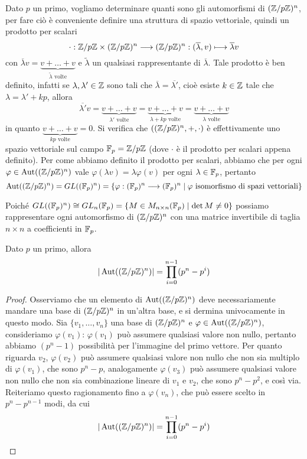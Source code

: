 \documentclass[11pt]{scrartcl}
\begin{document}
Dato $p$ un primo, vogliamo determinare quanti sono gli automorfismi di 
$({\mathbb Z}/p{\mathbb Z})^n$, per fare ciò è conveniente definire una struttura di spazio vettoriale,
quindi un prodotto per scalari\[
    \cdot:{\mathbb Z}/p{\mathbb Z}\times ({\mathbb Z}/p{\mathbb Z})^n \longrightarrow ({\mathbb Z}/p{\mathbb Z})^n : 
    (\overline{\lambda}, v)\longmapsto \overline{\lambda}v
\]
con $\overline{\lambda}v = \underset{\tilde{\lambda}\text{ volte}}{\underbrace{v + \ldots + v}}$
e $\tilde{\lambda}$ un qualsiasi rappresentante di $\overline{\lambda}$.
Tale prodotto è ben definito, infatti se $\lambda, \lambda' \in \mathbb Z$ sono tali che
$\overline{\lambda} = \overline{\lambda'}$, cioè esiste $k \in \mathbb Z$ tale che
$\lambda = \lambda' + kp$, allora \[
    \overline{\lambda'} v = \underset{\lambda'\text{ volte}}{\underbrace{v + \ldots + v}} = 
    \underset{\lambda + kp\text{ volte}}{\underbrace{v + \ldots + v}} = 
    \underset{\lambda\text{ volte}}{\underbrace{v + \ldots + v}}
\]in quanto $\underset{kp\text{ volte}}{\underbrace{v + \ldots + v}} = 0$. 
Si verifica che $(({\mathbb Z}/p{\mathbb Z})^n, +, \cdot)$ è effettivamente uno spazio vettoriale
sul campo $\mathbb F_p = {\mathbb Z}/p{\mathbb Z}$ (dove $\cdot$ è il prodotto per scalari appena definito).
Per come abbiamo definito il prodotto per scalari, abbiamo che per ogni
$\varphi \in \operatorname{Aut}(({\mathbb Z}/p{\mathbb Z})^n)$ vale $\varphi(\lambda v) = \lambda\varphi(v)$ 
per ogni $\lambda \in \mathbb F_p$, pertanto
\[
    \operatorname{Aut}(({\mathbb Z}/p{\mathbb Z})^n) = GL((\mathbb F_p)^n) = \{\varphi: (\mathbb F_p)^n\longrightarrow(\mathbb F_p)^n
    \mid\varphi\text{ isomorfismo di spazi vettoriali}\}
\]

Poiché $GL((\mathbb F_p)^n) \cong GL_n(\mathbb F_p) = \{M \in M_{n\times n}(\mathbb F_p)\mid \det M \neq 0\}$
possiamo rappresentare ogni automorfismo di $({\mathbb Z}/p{\mathbb Z})^n$ con una matrice invertibile
di taglia $n\times n$ a coefficienti in $\mathbb F_p$.

\begin{proposition}
Dato $p$ un primo, allora \[
    |\operatorname{Aut}(({\mathbb Z}/p{\mathbb Z})^n)| = \prod_{i = 0}^{n - 1} (p^n - p^i)
    \]
\end{proposition}

\begin{proof}
    Osserviamo che un elemento di $\operatorname{Aut}(({\mathbb Z}/p{\mathbb Z})^n)$ deve necessariamente mandare 
    una base di $({\mathbb Z}/p{\mathbb Z})^n$ in un'altra base, e si dermina univocamente in questo 
    modo. Sia $\{v_1, \ldots, v_n\}$ una base di $({\mathbb Z}/p{\mathbb Z})^n$ e $\varphi \in 
    \operatorname{Aut}(({\mathbb Z}/p{\mathbb Z})^n)$, consideriamo $\varphi(v_1)$: $\varphi(v_1)$ può assumere
    qualsiasi valore non nullo, pertanto abbiamo $(p^n - 1)$ possibilità per 
    l'immagine del primo vettore. Per quanto riguarda $v_2$, $\varphi(v_2)$
    può assumere qualsiasi valore non nullo che non sia multiplo di $\varphi(v_1)$,
    che sono $p^n - p$, analogamente $\varphi(v_3)$ può assumere qualsiasi
    valore non nullo che non sia combinazione lineare di $v_1$ e $v_2$, che sono
    $p^n - p^2$, e così via. Reiteriamo questo ragionamento fino a $\varphi(v_n)$,
    che può essere scelto in $p^n - p^{n - 1}$ modi, da cui \[
        |\operatorname{Aut}(({\mathbb Z}/p{\mathbb Z})^n)| = \prod_{i = 0}^{n - 1}(p^n - p^i)
    \]
\end{proof}
\end{document}
